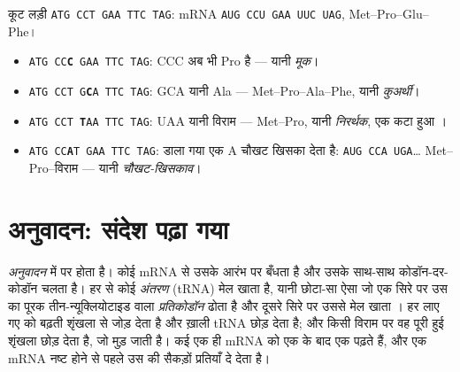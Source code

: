 \begin{example}[चार उत्परिवर्तन, चार नतीजे]\label{ex:g11:gene-expression:outcomes}
कूट लड़ी \texttt{ATG CCT GAA TTC TAG}: mRNA
\texttt{AUG CCU GAA UUC UAG},  Met--Pro--Glu--Phe।
\begin{itemize}
  \item \texttt{ATG CC\textbf{C} GAA TTC TAG}: CCC अब भी Pro है ---
        यानी \emph{मूक}।
  \item \texttt{ATG CCT G\textbf{C}A TTC TAG}: GCA यानी Ala ---
        Met--Pro--Ala--Phe, यानी \emph{कुअर्थी}।
  \item \texttt{ATG CCT \textbf{T}AA TTC TAG}: UAA यानी विराम ---
        Met--Pro, यानी \emph{निरर्थक}, एक कटा हुआ ।
  \item \texttt{ATG CC\textbf{A}T GAA TTC TAG}: डाला गया एक A चौखट खिसका
        देता है: \texttt{AUG CCA UGA}\dots{} Met--Pro--विराम ---
        यानी \emph{चौखट-खिसकाव}।
\end{itemize}
\end{example}

\section{अनुवादन: संदेश पढ़ा गया}

\begin{proposition}[अनुवादन]\label{prop:g11:gene-expression:translation}
\emph{अनुवादन}  में \emph{} पर होता
है। कोई  mRNA से उसके आरंभ  पर बँधता है और उसके साथ-साथ
कोडॉन-दर-कोडॉन चलता है। हर  से कोई \emph{अंतरण } (tRNA) मेल खाता
है, यानी छोटा-सा ऐसा  जो एक सिरे पर उस  का पूरक तीन-न्यूक्लियोटाइड
वाला \emph{प्रतिकोडॉन} ढोता है और दूसरे सिरे पर उससे मेल खाता ।
 हर लाए गए  को बढ़ती शृंखला से जोड़ देता है और ख़ाली
tRNA छोड़ देता है; और किसी विराम  पर वह पूरी हुई शृंखला छोड़ देता है,
जो मुड़ जाती है। कई  एक ही mRNA को एक के बाद एक पढ़ते हैं, और एक
mRNA नष्ट होने से पहले उस  की सैकड़ों प्रतियाँ दे देता है।
\end{proposition}
\admitted

